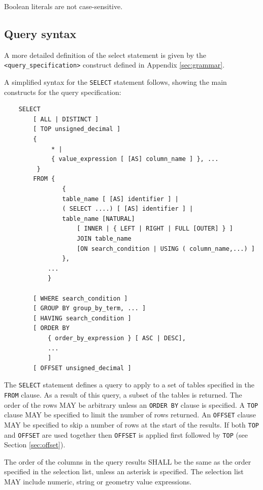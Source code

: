 \documentclass[11pt,a4paper]{ivoa}
\newcommand{\SectionSee}[1]{(see Section \ref{#1})\xspace}
\newcommand{\AppendixRef}[1]{Appendix \ref{#1}\xspace}
\begin{document}
Boolean literals are not case-sensitive.

\clearpage
\subsection{Query syntax}
\label{sec:syntax}

A more detailed definition of the select statement is given by the \verb:<query_specification>:
construct defined in \AppendixRef{sec:grammar}.

A simplified syntax for the \verb:SELECT: statement follows, showing the main constructs for
the query specification:

\begin{verbatim}
    SELECT
        [ ALL | DISTINCT ]
        [ TOP unsigned_decimal ]
        {
             * |
             { value_expression [ [AS] column_name ] }, ...
         }
        FROM {
                {
                table_name [ [AS] identifier ] |
                ( SELECT ....) [ [AS] identifier ] |
                table_name [NATURAL]
                    [ INNER | { LEFT | RIGHT | FULL [OUTER] } ]
                    JOIN table_name
                    [ON search_condition | USING ( column_name,...) ]
                },
            ...
            }

        [ WHERE search_condition ]
        [ GROUP BY group_by_term, ... ]
        [ HAVING search_condition ]
        [ ORDER BY
            { order_by_expression } [ ASC | DESC],
            ...
            ]
        [ OFFSET unsigned_decimal ]
\end{verbatim}

The \verb:SELECT: statement defines a query to apply to a set of tables specified
in the \verb:FROM: clause. As a result of this query, a subset of the tables
is returned.
The order of the rows MAY be arbitrary unless an \verb:ORDER BY: clause is specified.
A \verb:TOP: clause MAY be specified to limit the number of rows returned. 
An \verb:OFFSET: clause MAY be specified to skip a number of rows at the start
of the results.
If both \verb:TOP: and \verb:OFFSET: are used together then \verb:OFFSET: is applied
first followed by \verb:TOP: \SectionSee{sec:offset}. 

The order of the columns in the query results SHALL be the same as the
order specified in the selection list,
unless an asterisk is specified.
The selection list MAY include numeric,
string or geometry value expressions.
\end{document}
